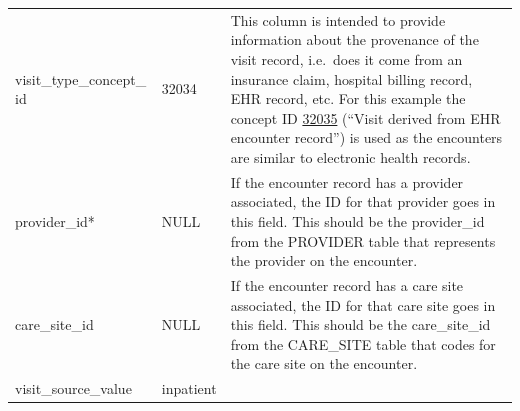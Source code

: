 \documentclass[11pt]{book}
\theoremstyle{definition}
\theoremstyle{definition}
\theoremstyle{definition}
\theoremstyle{remark}
\begin{document}
\begin{longtable}[]{@{}lll@{}}
\begin{minipage}[t]{0.28\columnwidth}\raggedright
visit\_type\_concept\_ id\strut
\end{minipage} & \begin{minipage}[t]{0.15\columnwidth}\raggedright
32034\strut
\end{minipage} & \begin{minipage}[t]{0.49\columnwidth}\raggedright
This column is intended to provide information about the provenance of the visit record, i.e.~does it come from an insurance claim, hospital billing record, EHR record, etc. For this example the concept ID \href{http://athena.ohdsi.org/search-terms/terms/32035}{32035} (``Visit derived from EHR encounter record'') is used as the encounters are similar to electronic health records.\strut
\end{minipage}\tabularnewline
\begin{minipage}[t]{0.28\columnwidth}\raggedright
provider\_id*\strut
\end{minipage} & \begin{minipage}[t]{0.15\columnwidth}\raggedright
NULL\strut
\end{minipage} & \begin{minipage}[t]{0.49\columnwidth}\raggedright
If the encounter record has a provider associated, the ID for that provider goes in this field. This should be the provider\_id from the PROVIDER table that represents the provider on the encounter.\strut
\end{minipage}\tabularnewline
\begin{minipage}[t]{0.28\columnwidth}\raggedright
care\_site\_id\strut
\end{minipage} & \begin{minipage}[t]{0.15\columnwidth}\raggedright
NULL\strut
\end{minipage} & \begin{minipage}[t]{0.49\columnwidth}\raggedright
If the encounter record has a care site associated, the ID for that care site goes in this field. This should be the care\_site\_id from the CARE\_SITE table that codes for the care site on the encounter.\strut
\end{minipage}\tabularnewline
\begin{minipage}[t]{0.28\columnwidth}\raggedright
visit\_source\_value\strut
\end{minipage} & \begin{minipage}[t]{0.15\columnwidth}\raggedright
inpatient\strut
\end{minipage} & \begin{minipage}[t]{0.49\columnwidth}\raggedright

\end{minipage}
\end{longtable}
\end{document}
